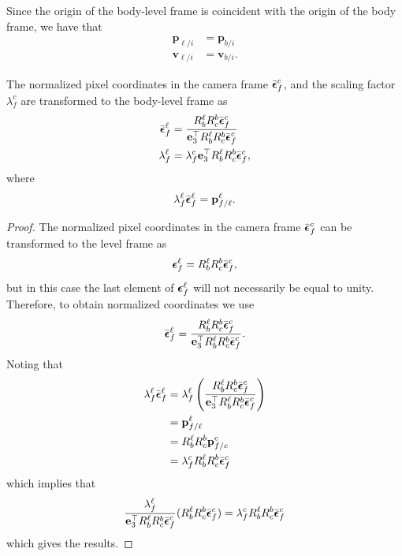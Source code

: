 Since the origin of the body-level frame is coincident with the origin of the body frame, we have that
\begin{align*}
\mathbf{p}_{\ell/i} &= \mathbf{p}_{b/i} \\	
\mathbf{v}_{\ell/i} &= \mathbf{v}_{b/i}.
\end{align*}

\begin{lemma} \label{lem:pixels_in_level_frame}
	The normalized pixel coordinates in the camera frame $\bar{\boldsymbol{\epsilon}}_f^c$, and the scaling factor $\lambda_f^c$ are transformed to the body-level frame as 
	\begin{align*}
	\bar{\boldsymbol{\epsilon}}_f^\ell &= \frac{R_b^\ell R_c^b \bar{\boldsymbol{\epsilon}}_f^c}{\mathbf{e}_3^\top R_b^\ell R_c^b \bar{\boldsymbol{\epsilon}}_f^c} \\
	\lambda_f^\ell &= \lambda_f^c \mathbf{e}_3^\top R_b^\ell R_c^b \bar{\boldsymbol{\epsilon}}_f^c,
	\end{align*}
	where 
	\[
	\lambda_f^\ell \bar{\boldsymbol{\epsilon}}_f^\ell = \mathbf{p}_{f/\ell}^\ell.
	\]
\end{lemma}
\begin{proof}
	The normalized pixel coordinates in the camera frame $\bar{\boldsymbol{\epsilon}}_f^c$ can be transformed to the level frame as
	\[
	\boldsymbol{\epsilon}_f^\ell = R_b^\ell R_c^b\bar{\boldsymbol{\epsilon}}_f^c,
	\]
	but in this case the last element of $\boldsymbol{\epsilon}_f^\ell$ will not necessarily be equal to unity.  Therefore, to obtain normalized coordinates we use
	\[
	\bar{\boldsymbol{\epsilon}}_f^\ell = \frac{R_b^\ell R_c^b\bar{\boldsymbol{\epsilon}}_f^c}{\mathbf{e}_3^\top R_b^\ell R_c^b\bar{\boldsymbol{\epsilon}}_f^c}.
	\]
	Noting that
	\begin{align*}
	\lambda_f^\ell \bar{\boldsymbol{\epsilon}}_f^\ell 
		&= \lambda_f^\ell \left(\frac{R_b^\ell R_c^b\bar{\boldsymbol{\epsilon}}_f^c}{\mathbf{e}_3^\top R_b^\ell R_c^b\bar{\boldsymbol{\epsilon}}_f^c} \right) \\
		&= \mathbf{p}_{f/\ell}^\ell \\
		&= R_b^\ell R_c^b \mathbf{p}_{f/c}^c \\
		&= \lambda_f^c R_b^\ell R_c^b \bar{\boldsymbol{\epsilon}}_f^c
	\end{align*}
	which implies that
	\[
	\frac{\lambda_f^\ell}{\mathbf{e}_3^\top R_b^\ell R_c^b \bar{\boldsymbol{\epsilon}}_f^c}(R_b^\ell R_c^b \bar{\boldsymbol{\epsilon}}_f^c) = \lambda_f^c R_b^\ell R_c^b \bar{\boldsymbol{\epsilon}}_f^c
	\]
	which gives the results.
\end{proof}

